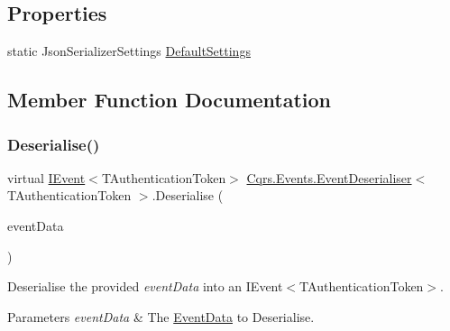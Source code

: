 \subsection*{Properties}
\begin{DoxyCompactItemize}
\item 
static Json\+Serializer\+Settings \hyperlink{classCqrs_1_1Events_1_1EventDeserialiser_a08bd067ca7ce8c28c7a83d444b7e468b_a08bd067ca7ce8c28c7a83d444b7e468b}{Default\+Settings}
\end{DoxyCompactItemize}


\subsection{Member Function Documentation}
\mbox{\label{classCqrs_1_1Events_1_1EventDeserialiser_a193feac1d58446f0a7447d8ba04179fc_a193feac1d58446f0a7447d8ba04179fc}} 
\subsubsection{\texorpdfstring{Deserialise()}{Deserialise()}}
{\footnotesize\ttfamily virtual \hyperlink{interfaceCqrs_1_1Events_1_1IEvent}{I\+Event}$<$T\+Authentication\+Token$>$ \hyperlink{classCqrs_1_1Events_1_1EventDeserialiser}{Cqrs.\+Events.\+Event\+Deserialiser}$<$ T\+Authentication\+Token $>$.Deserialise (\begin{DoxyParamCaption}\item[{\hyperlink{classCqrs_1_1Events_1_1EventData}{Event\+Data}}]{event\+Data }\end{DoxyParamCaption})\hspace{0.3cm}{\ttfamily [virtual]}}



Deserialise the provided {\itshape event\+Data}  into an I\+Event$<$\+T\+Authentication\+Token$>$. 


\begin{DoxyParams}{Parameters}
{\em event\+Data} & The \hyperlink{classCqrs_1_1Events_1_1EventData}{Event\+Data} to Deserialise.\\
\hline
\end{DoxyParams}


